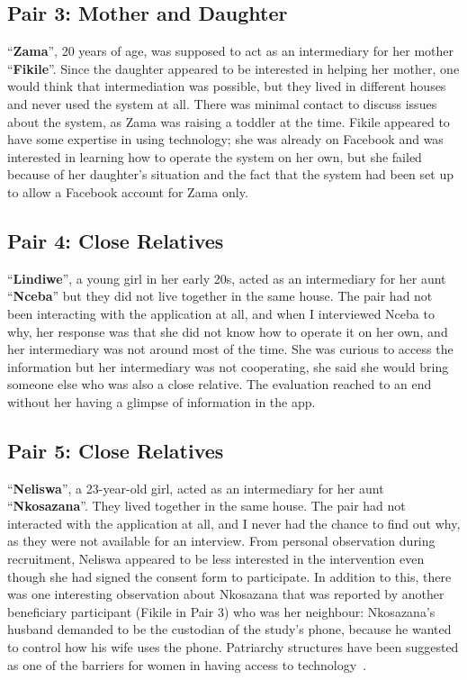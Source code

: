 \subsection*{\textbf{Pair 3: Mother and Daughter}}
``\textbf{Zama}'', 20 years of age, was supposed to act as an intermediary for her mother ``\textbf{Fikile}''. Since the daughter appeared to be interested in helping her mother, one would think that intermediation was possible, but they lived in different houses and never used the system at all. There was minimal contact to discuss issues about the system, as Zama was raising a toddler at the time. Fikile appeared to have some expertise in using technology; she was already on Facebook and was interested in learning how to operate the system on her own, but she failed because of her daughter's situation and the fact that the system had been set up to allow a Facebook account for Zama only.
\subsection*{\textbf{Pair 4: Close Relatives}}
``\textbf{Lindiwe}'', a young girl in her early 20s, acted as an intermediary for her aunt ``\textbf{Nceba}'' but they did not live together in the same house. The pair had not been interacting with the application at all, and when I interviewed Nceba to why, her response was that she did not know how to operate it on her own, and her intermediary was not around most of the time. She was curious to access the information but her intermediary was not cooperating, she said she would bring someone else who was also a close relative. The evaluation reached to an end without her having a glimpse of information in the app.
\subsection*{\textbf{Pair 5: Close Relatives}}
``\textbf{Neliswa}'', a 23-year-old girl, acted as an intermediary for her aunt ``\textbf{Nkosazana}''. They lived together in the same house. The pair had not interacted with the application at all, and I never had the chance to find out why, as they were not available for an interview. From personal observation during recruitment, Neliswa appeared to be less interested in the intervention even though she had signed the consent form to participate.  In addition to this, there was one interesting observation about Nkosazana that was reported by another beneficiary participant (Fikile in Pair 3) who was her neighbour: Nkosazana's husband demanded to be the custodian of the study's phone, because he wanted to  control how his wife uses the phone. Patriarchy structures have been suggested as one of the barriers for women in having access to technology~\citep{kumar2015mobile}.   
